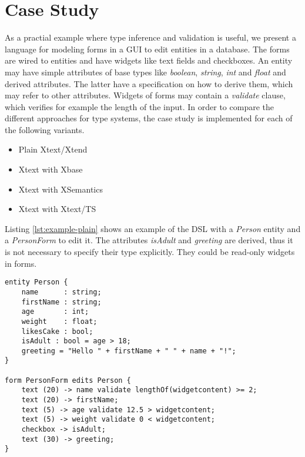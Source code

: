 \section{Case Study}
\label{sec:casestudy}

As a practial example where type inference and validation is useful, we present a language for modeling forms in a GUI to edit entities in a database. The forms are wired to entities and have widgets like text fields and checkboxes. An entity may have simple attributes of base types like \emph{boolean}, \emph{string}, \emph{int} and \emph{float} and derived attributes. The latter have a specification on how to derive them, which may refer to other attributes. Widgets of forms may contain a \emph{validate} clause, which verifies for example the length of the input. 
In order to compare the different approaches for type systems, the case study is implemented for each of the following variants.

\begin{itemize}
\item Plain Xtext/Xtend
\item Xtext with Xbase
\item Xtext with XSemantics
\item Xtext with Xtext/TS
\end{itemize}

Listing \ref{lst:example-plain} shows an example of the DSL with a \emph{Person} entity and a \emph{PersonForm} to edit it. The attributes \emph{isAdult} and \emph{greeting} are derived, thus it is not necessary to specify their type explicitly. They could be read-only widgets in forms.

%

\begin{lstlisting}[language=guidsl,label=lst:example-plain,caption=Forms
and Entities DSL.] 
entity Person {
	name      : string;
	firstName : string;
	age       : int; 
	weight    : float;
	likesCake : bool; 
	isAdult : bool = age > 18;
	greeting = "Hello " + firstName + " " + name + "!";
}

form PersonForm edits Person {
	text (20) -> name validate lengthOf(widgetcontent) >= 2;
	text (20) -> firstName;
	text (5) -> age validate 12.5 > widgetcontent;
	text (5) -> weight validate 0 < widgetcontent;
	checkbox -> isAdult;
	text (30) -> greeting;
}
\end{lstlisting}

